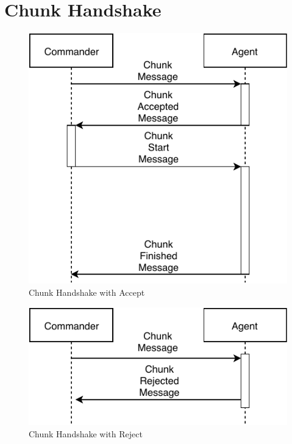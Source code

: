 \section{Chunk Handshake}
\begin{figure}[h]
	\begin{center}
	\includegraphics[scale=1]{Resources/PDF/ChunkAcceptedHandshake}
	\caption{Chunk Handshake with Accept}
	\label{pic:ChunkAcceptedHandshake}
	\end{center}
\end{figure}

\begin{figure}[h]
	\begin{center}
	\includegraphics[scale=1]{Resources/PDF/ChunkRejectHandshake}
	\caption{Chunk Handshake with Reject}
	\label{pic:ChunkRejectHandshake}
	\end{center}
\end{figure}
